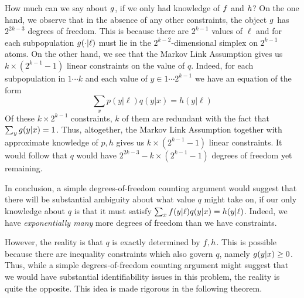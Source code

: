 How much can we say about $g$, if we only had knowledge of $f$ and $h$?  On the one hand, we observe that in the absence of any other constraints, the object $g$ has $2^{2k-3}$ degrees of freedom.  This is because there are $2^{k-1}$ values of $\ell$ and for each subpopulation $g(\cdot|\ell)$ must lie in the $2^{k-2}$-dimensional simplex on $2^{k-1}$ atoms.  On the other hand, we see that the Markov Link Assumption gives us $k\times(2^{k-1}-1)$ linear constraints on the value of $q$.  Indeed, for each subpopulation in $1\cdots k$ and each value of $y \in 1 \cdots 2^{k-1}$ we have an equation of the form
\[
\sum_x p(y|\ell)q(y|x)=h(y|\ell)
\]
Of these $k\times2^{k-1}$ constraints, $k$ of them are redundant with the fact that $\sum_y g(y|x)=1$.  Thus, altogether, the Markov Link Assumption together with approximate knowledge of $p,h$ gives us $k\times(2^{k-1}-1)$ linear constraints.  It would follow that $q$ would have $2^{2k-3} - k\times(2^{k-1}-1)$ degrees of freedom yet remaining.  

In conclusion, a simple degrees-of-freedom counting argument would suggest that there will be substantial ambiguity about what value $q$ might take on, if our only knowledge about $q$ is that it must satisfy $\sum_x f(y|\ell)q(y|x)=h(y|\ell)$.  Indeed, we have \emph{exponentially many} more degrees of freedom than we have constraints.  

However, the reality is that $q$ is exactly determined by $f,h$.  This is possible because there are inequality constraints which also govern $q$, namely $g(y|x)\geq 0$.  Thus, while a simple degrees-of-freedom counting argument might suggest that we would have substantial identifiability issues in this problem, the reality is quite the opposite.  This idea is made rigorous in the following theorem.  

